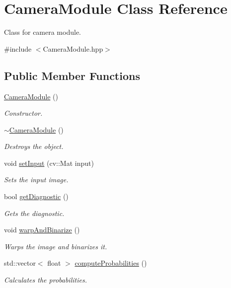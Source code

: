 \hypertarget{class_camera_module}{}\section{Camera\+Module Class Reference}
\label{class_camera_module}


Class for camera module.  




{\ttfamily \#include $<$Camera\+Module.\+hpp$>$}

\subsection*{Public Member Functions}
\begin{DoxyCompactItemize}
\item 
\hyperlink{class_camera_module_aee54ebbc4116cf63c1e9a95987d779a0}{Camera\+Module} ()
\begin{DoxyCompactList}\small\item\em Constructor. \end{DoxyCompactList}\item 
\hyperlink{class_camera_module_a04bd90027432f057e9b12d1c601c8fcb}{$\sim$\+Camera\+Module} ()\hypertarget{class_camera_module_a04bd90027432f057e9b12d1c601c8fcb}{}\label{class_camera_module_a04bd90027432f057e9b12d1c601c8fcb}

\begin{DoxyCompactList}\small\item\em Destroys the object. \end{DoxyCompactList}\item 
void \hyperlink{class_camera_module_abaf1518284d63d4e30d25e86d116856f}{set\+Input} (cv\+::\+Mat input)
\begin{DoxyCompactList}\small\item\em Sets the input image. \end{DoxyCompactList}\item 
bool \hyperlink{class_camera_module_aa160cacc20eb07d54e1130234f339a46}{get\+Diagnostic} ()
\begin{DoxyCompactList}\small\item\em Gets the diagnostic. \end{DoxyCompactList}\item 
void \hyperlink{class_camera_module_a1b442eae9cbc3101ed73d5dffbeb49f3}{warp\+And\+Binarize} ()\hypertarget{class_camera_module_a1b442eae9cbc3101ed73d5dffbeb49f3}{}\label{class_camera_module_a1b442eae9cbc3101ed73d5dffbeb49f3}

\begin{DoxyCompactList}\small\item\em Warps the image and binarizes it. \end{DoxyCompactList}\item 
std\+::vector$<$ float $>$ \hyperlink{class_camera_module_adefaf0a7a6f6d78cc6d8ff0d15ff77f4}{compute\+Probabilities} ()
\begin{DoxyCompactList}\small\item\em Calculates the probabilities. \end{DoxyCompactList}\end{DoxyCompactItemize}


